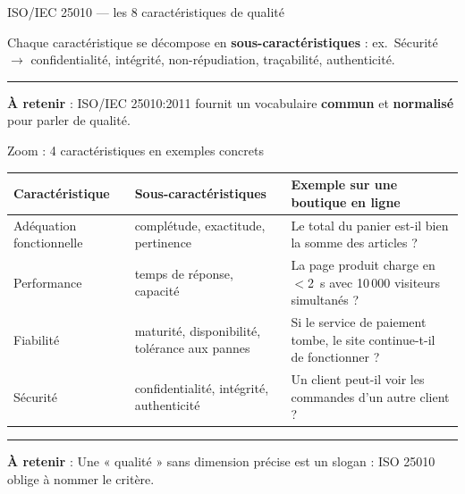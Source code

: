 \documentclass[aspectratio=169,11pt]{beamer}
\newcommand{\takeaway}[1]{%
\vfill\begin{beamercolorbox}[wd=\linewidth,sep=0.4em]{}
\color{accent2}\rule[0.6ex]{1.2em}{1.2pt}\hspace{0.4em}%
\textbf{\color{accent2}\small À retenir} \textcolor{textsoft}{:} %
{\small\color{textmain}#1}
\end{beamercolorbox}}
\begin{document}
\begin{frame}[t]{ISO/IEC 25010 --- les 8 caractéristiques de qualité}
\centering\footnotesize
{}
\vspace{0.4cm}

\textcolor{textsoft}{Chaque caractéristique se décompose en \textbf{sous-caractéristiques} : ex.\ Sécurité $\to$ confidentialité, intégrité, non-répudiation, traçabilité, authenticité.}
\takeaway{ISO/IEC 25010:2011 fournit un vocabulaire \textbf{commun} et \textbf{normalisé} pour parler de qualité.}
\end{frame}

\begin{frame}[t]{Zoom : 4 caractéristiques en exemples concrets}
\footnotesize
\begin{tabular}{@{}p{2.6cm} p{4cm} p{4.8cm}@{}}
\toprule
\textbf{\color{accent}Caractéristique} & \textbf{\color{accent}Sous-caractéristiques} & \textbf{\color{accent}Exemple sur une boutique en ligne} \\
\midrule
Adéquation fonctionnelle & complétude, exactitude, pertinence
& Le total du panier est-il bien la somme des articles ?\\
\addlinespace[0.2em]
Performance & temps de réponse, capacité
& La page produit charge en $<$2~s avec 10\,000 visiteurs simultanés ?\\
\addlinespace[0.2em]
Fiabilité & maturité, disponibilité, tolérance aux pannes
& Si le service de paiement tombe, le site continue-t-il de fonctionner ?\\
\addlinespace[0.2em]
Sécurité & confidentialité, intégrité, authenticité
& Un client peut-il voir les commandes d'un autre client ?\\
\bottomrule
\end{tabular}
\takeaway{Une « qualité » sans dimension précise est un slogan : ISO 25010 oblige à nommer le critère.}
\end{frame}
\end{document}
